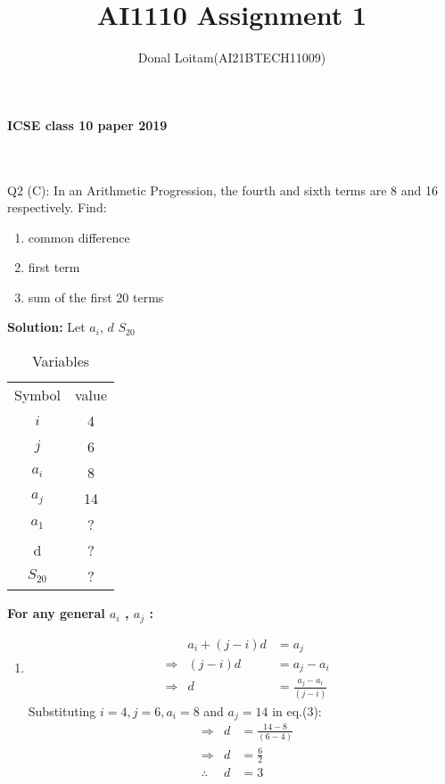 \documentclass[journal, 12pt, twocolumn]{IEEEtran}
\title{AI1110 Assignment 1}
\author{Donal Loitam(AI21BTECH11009)}
\begin{document}
    \maketitle

    \textbf{\large{ICSE class 10 paper 2019}}\\
    \\
    \\
    {Q2 (C):
    In an Arithmetic Progression, the fourth and sixth terms are 8 and 16 respectively. Find:
    \begin{enumerate}[label=(\roman*)]
    \item common difference
 	\item first term
 	\item sum of the first 20 terms
    \end{enumerate}
 
    \textbf{\large{Solution:}}
    Let $a_i$, 
 \(d\) 
$S_{20}$\\

\begin{table}[h!]
\caption{Variables}
    \centering
    \begin{tabular}{|c|c|}
        \hline
        Symbol & value \\
        $ i $  &  4   \\
         $ j $  &  6   \\
         $ a_i $ &  8  \\
         $ a_j $ & 14  \\
         $ a_1 $ &  ?  \\
            d    &  ?  \\
       $S_{20}$  &  ?  \\
          \hline
    \end{tabular}
\end{table}
    


\textbf{For any general $a_i$ , $a_j$ :}\\
\begin{enumerate}[label=(\roman*)]
\item \begin{align}
        &&a_i + (j-i)d &= a_j\\
        &\Rightarrow & (j-i)d &= a_j - a_i\\
        &\Rightarrow & d  &= \tfrac{a_j - a_i}{(j-i)}  
    \end{align}
Substituting  $i=4,j=6,a_i=8$ and $a_j=14$ in eq.(3):
\begin{align}
 & \Rightarrow & d  &= \tfrac{14-8}{(6-4)} \\
    & \Rightarrow & d  &= \tfrac{6}{2} \\
        &  \therefore  & d  &=  3   
\end{align}
    

\end{enumerate}}
\end{document}
